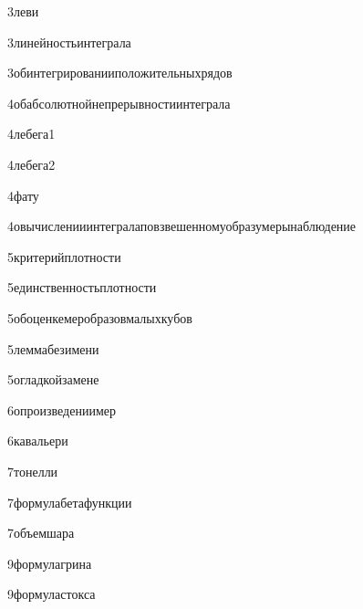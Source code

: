 {3}{леви}

{3}{линейностьинтеграла}

{3}{обинтегрированииположительныхрядов}

{4}{обабсолютнойнепрерывностиинтеграла}

{4}{лебега1}

{4}{лебега2}

{4}{фату}

{4}{овычисленииинтегралаповзвешенномуобразумерынаблюдение}

{5}{критерийплотности}

{5}{единственностьплотности}

{5}{обоценкемеробразовмалыхкубов}

{5}{леммабезимени}

{5}{огладкойзамене}

{6}{опроизведениимер}

{6}{кавальери}

{7}{тонелли}

{7}{формулабетафункции}

{7}{объемшара}

{9}{формулагрина}

{9}{формуластокса}

